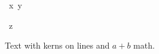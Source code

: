 \hbox{%
\kern 3pt x\kern 2pt
y}

\hbox{\kern 1pt
\kern 2pt z}

Text with \kern 4pt kerns
\kern 5pt on lines and $a
+b$ math.
\bye

